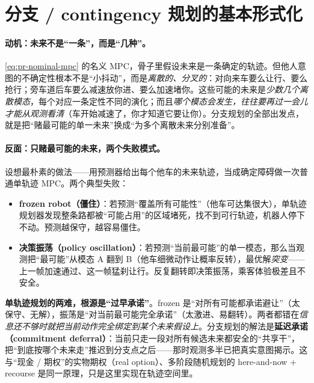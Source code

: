 \section{分支 / contingency 规划的基本形式化}
\label{sec:pr-branch-form}

\paragraph{动机：未来不是“一条”，而是“几种”。}
\cref{eq:pr-nominal-mpc} 的名义 MPC，骨子里假设未来是一条确定的轨迹。但他人意图的不确定性根本不是“小抖动”，而是\emph{离散的、分叉的}：对向来车要么让行、要么抢行；旁车道后车要么减速放你进、要么加速堵你。这些可能的未来是\emph{少数几个离散模态}，每个对应一条定性不同的演化；而且\emph{哪个模态会发生，往往要再过一会儿才能从观测看清}（车开始减速了，你才知道它要让你）。分支规划的全部出发点，就是把“赌最可能的单一未来”换成“为多个离散未来分别准备”。

\paragraph{反面：只赌最可能的未来，两个失败模式。}
设想最朴素的做法——用预测器给出每个他车的未来轨迹，当成确定障碍做一次普通单轨迹 MPC。两个典型失败：
\begin{itemize}
  \item \textbf{frozen robot（僵住）}：若预测“覆盖所有可能性”（他车可达集很大），单轨迹规划器发现整条路都被“可能占用”的区域堵死，找不到可行轨迹，机器人停下不动。预测越保守，越容易僵住。
  \item \textbf{决策振荡（policy oscillation）}：若预测“当前最可能”的单一模态，那么当观测把“最可能”从模态 A 翻到 B（他车细微动作让概率反转），最优解\emph{突变}——上一帧加速通过、这一帧猛刹让行。反复翻转即决策振荡，乘客体验极差且不安全。
\end{itemize}

\begin{insight}
\textbf{单轨迹规划的两难，根源是“过早承诺”}。frozen 是“对所有可能都承诺避让”（太保守、无解），振荡是“对当前最可能完全承诺”（太激进、易翻转）。两者都错在\emph{信息还不够时就把当前动作完全绑定到某个未来假设上}。分支规划的解法是\textbf{延迟承诺（commitment deferral）}：当前只走一段对所有候选未来都安全的“共享干”，把“到底按哪个未来走”推迟到分支点之后——那时观测多半已把真实意图揭示。这与“现金 / 期权”的实物期权（real option）、多阶段随机规划的 here-and-now + recourse 是同一原理，只是这里实现在轨迹空间里。
\end{insight}

